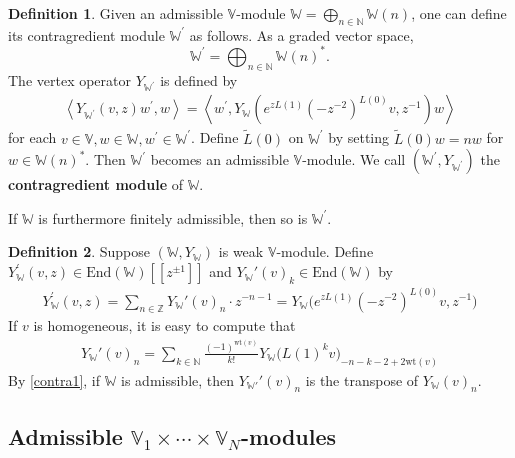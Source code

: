 \documentclass[11pt,b5paper,notitlepage]{article}
\theoremstyle{definition}
\newtheorem{df}{Definition}[subsection]
\theoremstyle{plain}
\newcommand{\wtd}{\widetilde}
\newcommand{\End}{\mathrm{End}} %
\newcommand{\Vbb}{\mathbb V}
\newcommand{\Wbb}{\mathbb W}
\newcommand{\Nbb}{\mathbb N}
\newcommand{\Zbb}{\mathbb Z}
\newcommand{\wt}{\mathrm{wt}}
\newcommand{\<}{\left\langle}
\renewcommand{\>}{\right\rangle}
\numberwithin{equation}{subsection}
\begin{document}
\begin{df}
    Given an admissible $\Vbb$-module $\Wbb=\bigoplus_{n\in \Nbb} \Wbb(n)$, one can define its contragredient module $\Wbb^\prime$ as follows. As a graded vector space,
    \begin{equation}\label{grading2}
    \Wbb^\prime=\bigoplus_{n\in \Nbb}\Wbb(n)^*.
    \end{equation}
    The vertex operator $Y_{\Wbb^\prime}$ is defined by 
    \begin{align}\label{contra1}
    \<Y_{\Wbb^\prime}(v,z)w^\prime,w\>=\<w^\prime ,Y_\Wbb(e^{zL(1)}(-z^{-2})^{L(0)}v,z^{-1})w\>
    \end{align}
    for each $v\in \Vbb,w\in \Wbb,w^\prime\in \Wbb^\prime$.    Define $\wtd{L}(0)$ on $\Wbb^{\prime}$ by setting $\wtd{L}(0)w=nw$ for $w\in \Wbb(n)^*$. Then $\Wbb^\prime$ becomes an admissible $\Vbb$-module. We call $(\Wbb^\prime,Y_{\Wbb^\prime})$ the \textbf{contragredient module} of $\Wbb$.
\end{df}
 
 If $\Wbb$ is furthermore finitely admissible, then so is $\Wbb^\prime$.

\begin{df}\label{lb59}
    Suppose $(\Wbb,Y_\Wbb)$ is weak $\Vbb$-module. Define $Y_\Wbb^\prime(v,z)\in\End(\Wbb)[[z^{\pm1}]]$ and $Y_\Wbb'(v)_k\in\End(\Wbb)$ by \index{Y@$Y_\Wbb^\prime(v,z),Y_\Wbb^\prime(v)_k$}
    \begin{gather}
        Y_\Wbb^\prime(v,z)=\sum_{n\in\Zbb}Y_\Wbb'(v)_n\cdot z^{-n-1}=Y_\Wbb\big(e^{zL(1)}(-z^{-2})^{L(0)}v,z^{-1}\big)  \label{eq138}
    \end{gather}
If $v$ is homogeneous, it is easy to compute that
\begin{align}
    Y_\Wbb'(v)_n =\sum_{k\in \Nbb} \frac{(-1)^{\wt(v)}}{k!}Y_\Wbb\big(L(1)^k v\big)_{-n-k-2+2\wt(v)}   \label{eq139}
\end{align}
By \eqref{contra1}, if $\Wbb$ is admissible, then $Y_{\Wbb'}'(v)_n$ is the transpose of $Y_\Wbb(v)_n$.
\end{df}



\subsection{Admissible $\Vbb_1\times \cdots \times \Vbb_N$-modules}
\end{document}

